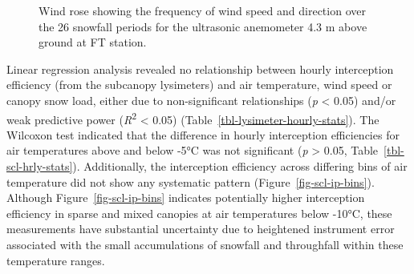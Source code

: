 \documentclass[
  letterpaper,
]{tex/uofsthesis-cs}
\begin{document}
\begin{figure}


\caption{\label{fig-wind-rose}Wind rose showing the frequency of wind
speed and direction over the 26 snowfall periods for the ultrasonic
anemometer 4.3 m above ground at FT station.}

\end{figure}%

Linear regression analysis revealed no relationship between hourly
interception efficiency (from the subcanopy lysimeters) and air
temperature, wind speed or canopy snow load, either due to
non-significant relationships (\emph{p} \textless{} 0.05) and/or weak
predictive power (\emph{R}\textsuperscript{2} \textless{} 0.05)
(Table~\ref{tbl-lysimeter-hourly-stats}). The Wilcoxon test indicated
that the difference in hourly interception efficiencies for air
temperatures above and below -5°C was not significant (\emph{p}
\textgreater{} 0.05, Table~\ref{tbl-scl-hrly-stats}). Additionally, the
interception efficiency across differing bins of air temperature did not
show any systematic pattern (Figure~\ref{fig-scl-ip-bins}). Although
Figure~\ref{fig-scl-ip-bins} indicates potentially higher interception
efficiency in sparse and mixed canopies at air temperatures below -10°C,
these measurements have substantial uncertainty due to heightened
instrument error associated with the small accumulations of snowfall and
throughfall within these temperature ranges.
\end{document}
